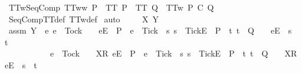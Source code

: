 \begin{isabellebody}
{\isafoldproof}%
%
\isadelimproof
\isanewline
%
\endisadelimproof
\isanewline
\isanewline
{}\isamarkupfalse%
\ TT{}w{\isacharunderscore}SeqComp{\isacharcolon}\ {\isachardoublequoteopen}TT{}ww\ P\ {\isasymLongrightarrow}\ TT\ P\ {\isasymLongrightarrow}\ TT\ Q\ {\isasymLongrightarrow}\ TT{}w\ {\isacharparenleft}P\ {\isacharsemicolon}\isactrlsub C\ Q{\isacharparenright}{\isachardoublequoteclose}\isanewline
%
\isadelimproof
\ \ %
\endisadelimproof
%
\isatagproof
{}\isamarkupfalse%
\ SeqCompTT{\isacharunderscore}def\ TT{}w{\isacharunderscore}def\isanewline
{}\isamarkupfalse%
\ auto\isanewline
\ \ \isamarkupfalse%
\ {\isasymrho}\ X\ Y\isanewline
\ \ \isamarkupfalse%
\ assm{}{\isacharcolon}\ {\isachardoublequoteopen}Y\ {\isasyminter}\ {\isacharbraceleft}e{\isachardot}\ e\ {\isasymnoteq}\ Tock\ {\isasymand}\ {\isacharparenleft}{\isasymrho}\ {\isacharat}\ {\isacharbrackleft}{\isacharbrackleft}e{\isacharbrackright}\isactrlsub E{\isacharbrackright}\ {\isasymin}\ P\ {\isasymand}\ e\ {\isasymnoteq}\ Tick\ {\isasymor}\ {\isacharparenleft}{\isasymexists}s{\isachardot}\ s\ {\isacharat}\ {\isacharbrackleft}{\isacharbrackleft}Tick{\isacharbrackright}\isactrlsub E{\isacharbrackright}\ {\isasymin}\ P\ {\isasymand}\ {\isacharparenleft}{\isasymexists}t{\isachardot}\ t\ {\isasymin}\ Q\ {\isasymand}\ {\isasymrho}\ {\isacharat}\ {\isacharbrackleft}{\isacharbrackleft}e{\isacharbrackright}\isactrlsub E{\isacharbrackright}\ {\isacharequal}\ s\ {\isacharat}\ t{\isacharparenright}{\isacharparenright}{\isacharparenright}\ {\isasymor}\isanewline
\ \ \ \ \ \ \ \ \ \ \ e\ {\isacharequal}\ Tock\ {\isasymand}\ {\isacharparenleft}{\isasymrho}\ {\isacharat}\ {\isacharbrackleft}{\isacharbrackleft}X{\isacharbrackright}\isactrlsub R{\isacharcomma}\ {\isacharbrackleft}e{\isacharbrackright}\isactrlsub E{\isacharbrackright}\ {\isasymin}\ P\ {\isasymand}\ e\ {\isasymnoteq}\ Tick\ {\isasymor}\ {\isacharparenleft}{\isasymexists}s{\isachardot}\ s\ {\isacharat}\ {\isacharbrackleft}{\isacharbrackleft}Tick{\isacharbrackright}\isactrlsub E{\isacharbrackright}\ {\isasymin}\ P\ {\isasymand}\ {\isacharparenleft}{\isasymexists}t{\isachardot}\ t\ {\isasymin}\ Q\ {\isasymand}\ {\isasymrho}\ {\isacharat}\ {\isacharbrackleft}{\isacharbrackleft}X{\isacharbrackright}\isactrlsub R{\isacharcomma}\ {\isacharbrackleft}e{\isacharbrackright}\isactrlsub E{\isacharbrackright}\ {\isacharequal}\ s\ {\isacharat}\ t{\isacharparenright}{\isacharparenright}{\isacharparenright}{\isacharbraceright}\ {\isacharequal}\ {\isacharbraceleft}{\isacharbraceright}{\isachardoublequoteclose}\isanewline

\end{isabellebody}
